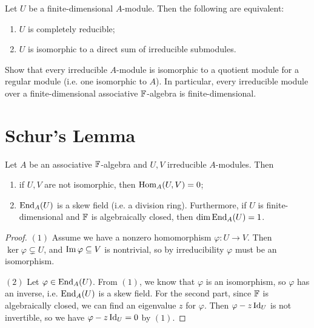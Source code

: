 \begin{corollary}
  Let $U$ be a finite-dimensional
  $A$-module. Then the following are
  equivalent:
  \begin{enumerate}
    \item $U$ is completely reducible;
    \item $U$ is isomorphic to a direct
      sum of irreducible submodules.
  \end{enumerate}
\end{corollary}

\begin{exercise}
  Show that every irreducible $A$-module is
  isomorphic to a quotient
  module for a regular module (i.e. one
  isomorphic to $A$).
  In particular, every irreducible module
  over a finite-dimensional associative
  $\mathbb{F}$-algebra is finite-dimensional.
\end{exercise}

\section{Schur's Lemma}
\begin{theorem}
  Let $A$ be an associative $\mathbb{F}$-algebra
  and $U, V$ irreducible $A$-modules.
  Then
  \begin{enumerate}
    \item if $U, V$ are not
      isomorphic, then
      $\operatorname{Hom}_A(U, V) = 0$;
    \item $\operatorname{End}_A(U)$ is a skew
      field (i.e. a division ring).
      Furthermore, if
      $U$ is finite-dimensional
      and $\mathbb{F}$ is algebraically closed, then
      $\dim \operatorname{End}_A(U) = 1$.
  \end{enumerate}
\end{theorem}

\begin{proof}
  $(1)$ Assume we have a nonzero homomorphism
  $\varphi : U \to V$. Then
  $\ker \varphi \subsetneq U$, and
  $\operatorname{Im} \varphi \subseteq V$ is
  nontrivial, so by irreducibility
  $\varphi$ must be an isomorphism.

  $(2)$ Let $\varphi \in \operatorname{End}_A(U)$.
  From $(1)$, we know that
  $\varphi$ is an isomorphism, so
  $\varphi$ has an inverse, i.e.
  $\operatorname{End}_A(U)$ is a skew field.
  For the second part, since
  $\mathbb{F}$ is algebraically closed, we can
  find an eigenvalue $z$ for $\varphi$.
  Then $\varphi - z \operatorname{Id}_U$ is not
  invertible, so we have
  $\varphi - z \operatorname{Id}_U = 0$ by $(1)$.
\end{proof}

